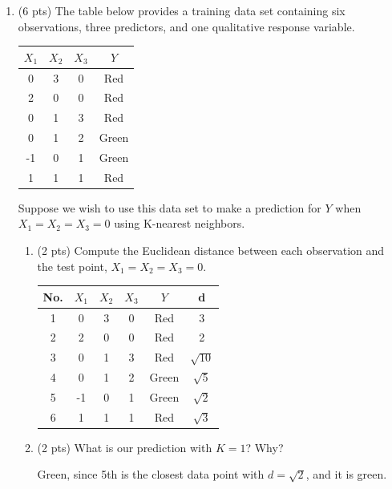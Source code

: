 \documentclass[a4paper]{article}
\theoremstyle{definition}
\newenvironment{soln}{
    \leavevmode\color{blue}\ignorespaces
}{}
\begin{document}
\begin{enumerate}
\item (6 pts) The table below provides a training data set containing six observations, three predictors, and one qualitative response variable.

\begin{center}
	\begin{tabular}{ c  c  c  c}
		\hline
		$X_{1}$ & $X_{2}$ & $X_{3}$ & $Y$ \\ \hline
		0 & 3 & 0 & Red \\
		2 & 0 & 0 & Red \\
		0 & 1 & 3 & Red \\
		0 & 1 & 2 & Green \\
		-1 & 0 & 1 & Green \\
		1 & 1 & 1 & Red  \\
		\hline
	\end{tabular}
\end{center}

Suppose we wish to use this data set to make a prediction for $Y$ when $X_{1} = X_{2} = X_{3} = 0$ using K-nearest neighbors.

\begin{enumerate}
	\item (2 pts) Compute the Euclidean distance between each observation and the test point, $X_{1} = X_{2} = X_{3}=0$.
 
	\begin{soln}
 \begin{center}
	\begin{tabular}{c  c  c  c  c c}
		\hline
		No. & $X_{1}$ & $X_{2}$ & $X_{3}$ & $Y$ & d \\ \hline
		1 & 0 & 3 & 0 & Red & 3\\
		2 & 2 & 0 & 0 & Red & 2\\
		3 & 0 & 1 & 3 & Red & $\sqrt{10}$\\
		4 & 0 & 1 & 2 & Green & $\sqrt{5}$\\
		5 & -1 & 0 & 1 & Green & $\sqrt{2}$\\
		6 & 1 & 1 & 1 & Red  & $\sqrt{3}$\\
		\hline
	\end{tabular}
\end{center}
\end{soln}
 
	\item (2 pts) What is our prediction with $K=1$? Why?
	
	\begin{soln}
 Green, since 5th is the closest data point with $d=\sqrt{2}$, and it is green.
 \end{soln}
	

\end{enumerate}
\end{enumerate}
\end{document}
